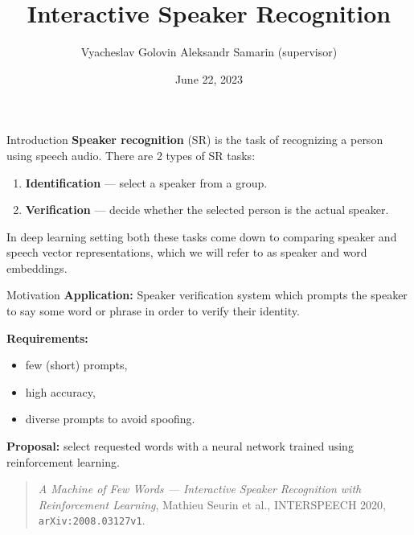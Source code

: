 \documentclass[11pt, aspectratio=169]{beamer}
\title{Interactive Speaker Recognition}
\author{Vyacheslav Golovin \texorpdfstring{\newline}{, }
    {\small Aleksandr Samarin (supervisor)}}
\institute[HSE]{Huawei CBG AI and HSE University}
\date{June 22, 2023}
\begin{document}
\maketitle

\begin{frame}{Introduction}
    \textbf{Speaker recognition} (SR) is the task of recognizing a person using
    speech audio. There are 2 types of SR tasks:
    \begin{enumerate}
        \item \textbf{Identification} --- select a speaker from a group.
        \item \textbf{Verification} --- decide whether the selected person
        is the actual speaker.
    \end{enumerate}

    In deep learning setting both these tasks come down to comparing speaker
    and speech vector representations, which we will refer to as
    \alert{speaker} and \alert{word embeddings}.
\end{frame}

\begin{frame}{Motivation}
    \textbf{Application:} Speaker verification system which prompts the speaker
    to say some word or phrase in order to verify their identity.

    \textbf{Requirements:}
    \begin{itemize}
        \item few (short) prompts,
        \item high accuracy,
        \item diverse prompts to avoid spoofing.
    \end{itemize}

    \textbf{Proposal:} select requested words with a neural network trained
    using reinforcement learning.\vspace{1em}

    \begin{quote}
        \normalfont{}
        \emph{A Machine of Few Words --- Interactive
        Speaker Recognition with Reinforcement Learning}, Mathieu Seurin et al.,
        INTERSPEECH 2020, \texttt{arXiv:2008.03127v1}.
    \end{quote}

\end{frame}
\end{document}
